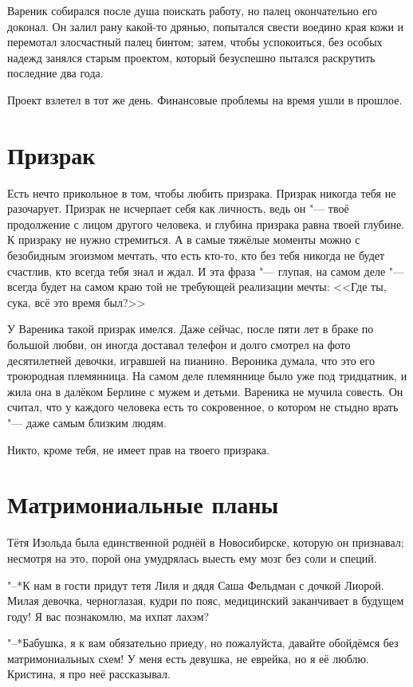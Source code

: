 Вареник собирался после душа поискать работу, но палец окончательно его доконал.
Он залил рану какой-то дрянью, попытался свести воедино края кожи и перемотал злосчастный палец бинтом;
затем, чтобы успокоиться, без особых надежд занялся старым проектом, который безуспешно пытался раскрутить последние два года.

Проект взлетел в тот же день.
Финансовые проблемы на время ушли в прошлое.

\section{Призрак}

Есть нечто прикольное в том, чтобы любить призрака.
Призрак никогда тебя не разочарует.
Призрак не исчерпает себя как личность, ведь он "--- твоё продолжение с лицом другого человека, и глубина призрака равна твоей глубине.
К призраку не нужно стремиться.
А в самые тяжёлые моменты можно с безобидным эгоизмом мечтать, что есть кто-то, кто без тебя никогда не будет счастлив, кто всегда тебя знал и ждал.
И эта фраза "--- глупая, на самом деле "--- всегда будет на самом краю той не требующей реализации мечты: <<Где ты, сука, всё это время был?>>

У Вареника такой призрак имелся.
Даже сейчас, после пяти лет в браке по большой любви, он иногда доставал телефон и долго смотрел на фото десятилетней девочки, игравшей на пианино.
Вероника думала, что это его троюродная племянница.
На самом деле племяннице было уже под тридцатник, и жила она в далёком Берлине с мужем и детьми.
Вареника не мучила совесть.
Он считал, что у каждого человека есть то сокровенное, о котором не стыдно врать "--- даже самым близким людям.

Никто, кроме тебя, не имеет прав на твоего призрака.

\section{Матримониальные планы}

Тётя Изольда была единственной роднёй в Новосибирске, которую он признавал;
несмотря на это, порой она умудрялась выесть ему мозг без соли и специй.

"--*К нам в гости придут тетя Лиля и дядя Саша Фельдман с дочкой Лиорой.
Милая девочка, черноглазая, кудри по пояс, медицинский заканчивает в будущем году!
Я вас познакомлю, ма ихпат лахэм?

"--*Бабушка, я к вам обязательно приеду, но пожалуйста, давайте обойдёмся без матримониальных схем!
У меня есть девушка, не еврейка, но я её люблю.
Кристина, я про неё рассказывал.


